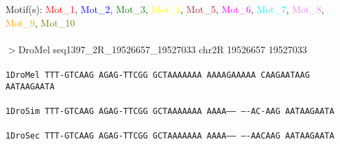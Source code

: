 \documentclass[11pt,twoside,reqno,a4paper]{article}
\begin{document}
\noindent
\newlength{\charwidth}Motif(s): \textcolor{red}{Mot\_1}, \textcolor{blue}{Mot\_2}, \textcolor{green}{Mot\_3}, \textcolor{yellow}{Mot\_4}, \textcolor{brown}{Mot\_5}, \textcolor{magenta}{Mot\_6}, \textcolor{cyan}{Mot\_7}, \textcolor{violet}{Mot\_8}, \textcolor{orange}{Mot\_9}, \textcolor{olive}{Mot\_10}\\
\\
$>$DroMel	seq1397\_2R\_19526657\_19527033	chr2R	19526657	19527033 \\
 \\
\texttt{1\hspace*{3\charwidth}DroMel	TTT-GTCAAG	AGAG-TTCGG	GCTAAAAAAA	AAAAGAAAAA	CAAGAATAAG	AATAAGAATA	\\
\hspace*{4\charwidth}\hspace*{7\charwidth}\hspace*{1\charwidth}\hspace*{1\charwidth}\hspace*{1\charwidth}\hspace*{1\charwidth}\hspace*{1\charwidth}\hspace*{1\charwidth}\\
1\hspace*{3\charwidth}DroSim	TTT-GTCAAG	AGAG-TTCGG	GCTAAAAAAA	AAAA------	----AC-AAG	AATAAGAATA	\\
\hspace*{4\charwidth}\hspace*{7\charwidth}\hspace*{1\charwidth}\hspace*{1\charwidth}\hspace*{1\charwidth}\hspace*{1\charwidth}\hspace*{1\charwidth}\hspace*{1\charwidth}\\
1\hspace*{3\charwidth}DroSec	TTT-GTCAAG	AGAG-TTCGG	GCTAAAAAAA	AAAA------	----AACAAG	AATAAGAATA	\\
\hspace*{4\charwidth}\hspace*{7\charwidth}\hspace*{1\charwidth}\hspace*{1\charwidth}\hspace*{1\charwidth}\hspace*{1\charwidth}\hspace*{1\charwidth}\hspace*{1\charwidth}\\
}
\end{document}
